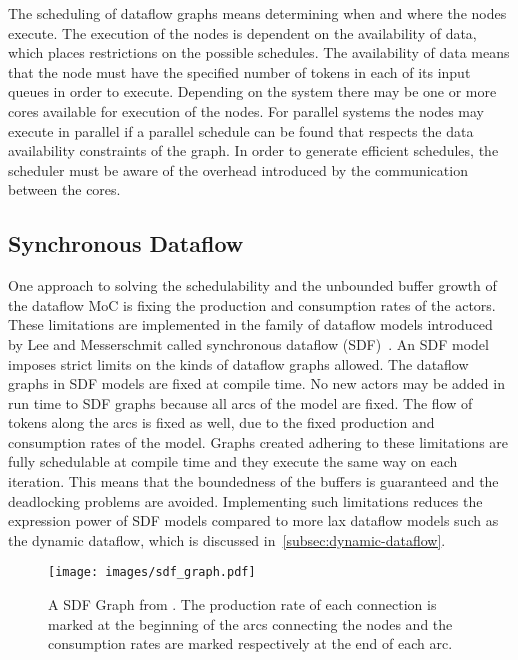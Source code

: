 The scheduling of dataflow graphs means determining when and where the nodes execute. The execution of the nodes is dependent on the availability of data, which places restrictions on the possible schedules. The availability of data means that the node must have the specified number of tokens in each of its input queues in order to execute. Depending on the system there may be one or more cores available for execution of the nodes. For parallel systems the nodes may execute in parallel if a parallel schedule can be found that respects the data availability constraints of the graph. In order to generate efficient schedules, the scheduler must be aware of the overhead introduced by the communication between the cores.~\cite{lee1987synchronous}

\subsection{Synchronous Dataflow}
\label{subsec:synchronous-dataflow}
\FloatBarrier
One approach to solving the schedulability and the unbounded buffer growth of the dataflow MoC is fixing the production and consumption rates of the actors. These limitations are implemented in the family of dataflow models introduced by Lee and Messerschmit called synchronous dataflow (SDF)~\cite{lee1987synchronous}. An SDF model imposes strict limits on the kinds of dataflow graphs allowed. The dataflow graphs in SDF models are fixed at compile time. No new actors may be added in run time to SDF graphs because all arcs of the model are fixed. The flow of tokens along the arcs is fixed as well, due to the fixed production and consumption rates of the model. Graphs created adhering to these limitations are fully schedulable at compile time and they execute the same way on each iteration. This means that the boundedness of the buffers is guaranteed and the deadlocking problems are avoided. Implementing such limitations reduces the expression power of SDF models compared to more lax dataflow models such as the dynamic dataflow, which is discussed in~\ref{subsec:dynamic-dataflow}.~\cite{lee2015introduction}

\begin{figure}[h!]
    \begin{center}
        \texttt{[image: images/sdf\_graph.pdf]}
        \caption{A SDF Graph from \cite{ade1997data}. The production rate of each connection is marked at the beginning of the arcs connecting the nodes and the consumption rates are marked respectively at the end of each arc.}
        \label{fig:sdf_graph}
    \end{center}
\end{figure}

